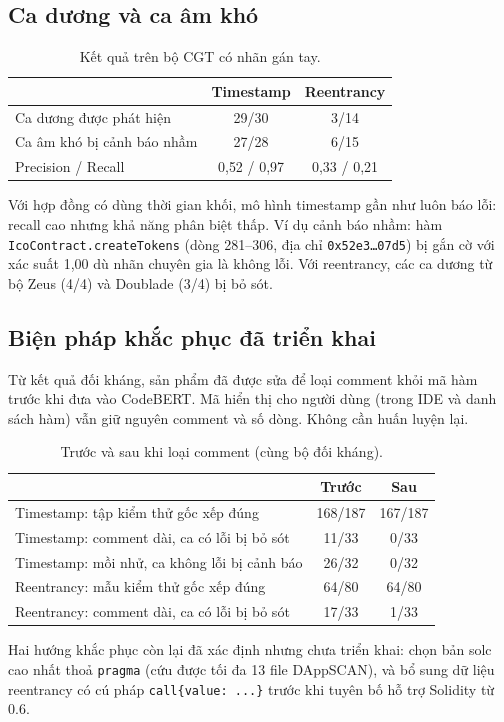 \documentclass[12pt,a4paper]{article}
\newcommand{\code}[1]{\texttt{#1}}
\begin{document}
\subsection{Ca dương và ca âm khó}
\begin{table}[H]\centering\small
\caption{Kết quả trên bộ CGT có nhãn gán tay.}\label{tab:hard}
\begin{tabular}{lcc}
\toprule
 & Timestamp & Reentrancy\\
\midrule
Ca dương được phát hiện & 29/30 & 3/14\\
Ca âm khó bị cảnh báo nhầm & 27/28 & 6/15\\
Precision / Recall & 0{,}52 / 0{,}97 & 0{,}33 / 0{,}21\\
\bottomrule
\end{tabular}
\end{table}
Với hợp đồng có dùng thời gian khối, mô hình timestamp gần như luôn báo lỗi: recall cao nhưng khả năng phân biệt thấp. Ví dụ cảnh báo nhầm: hàm \code{IcoContract.createTokens} (dòng 281--306, địa chỉ \code{0x52e3\ldots07d5}) bị gắn cờ với xác suất 1{,}00 dù nhãn chuyên gia là không lỗi. Với reentrancy, các ca dương từ bộ Zeus (4/4) và Doublade (3/4) bị bỏ sót.

\subsection{Biện pháp khắc phục đã triển khai}
Từ kết quả đối kháng, sản phẩm đã được sửa để loại comment khỏi mã hàm trước khi đưa vào CodeBERT. Mã hiển thị cho người dùng (trong IDE và danh sách hàm) vẫn giữ nguyên comment và số dòng. Không cần huấn luyện lại.
\begin{table}[H]\centering\small
\caption{Trước và sau khi loại comment (cùng bộ đối kháng).}\label{tab:fix}
\begin{tabular}{lcc}
\toprule
 & Trước & Sau\\
\midrule
Timestamp: tập kiểm thử gốc xếp đúng & 168/187 & 167/187\\
Timestamp: comment dài, ca có lỗi bị bỏ sót & 11/33 & 0/33\\
Timestamp: mồi nhử, ca không lỗi bị cảnh báo & 26/32 & 0/32\\
Reentrancy: mẫu kiểm thử gốc xếp đúng & 64/80 & 64/80\\
Reentrancy: comment dài, ca có lỗi bị bỏ sót & 17/33 & 1/33\\
\bottomrule
\end{tabular}
\end{table}
Hai hướng khắc phục còn lại đã xác định nhưng chưa triển khai: chọn bản solc cao nhất thoả \code{pragma} (cứu được tối đa 13 file DAppSCAN), và bổ sung dữ liệu reentrancy có cú pháp \code{call\{value: ...\}} trước khi tuyên bố hỗ trợ Solidity từ 0.6.
\end{document}
